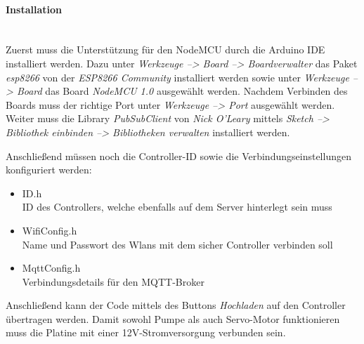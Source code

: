     \paragraph*{Installation}\mbox{}\\
    Zuerst muss die Unterstützung für den NodeMCU durch die Arduino IDE installiert werden. Dazu unter \textit{Werkzeuge --> Board --> Boardverwalter} das Paket \textit{esp8266} von der \textit{ESP8266 Community} installiert werden sowie unter \textit{Werkzeuge --> Board} das Board \textit{NodeMCU 1.0} ausgewählt werden. Nachdem Verbinden des Boards muss der richtige Port unter \textit{Werkzeuge --> Port} ausgewählt werden. Weiter muss die Library \textit{PubSubClient} von \textit{Nick O'Leary} mittels \textit{Sketch --> Bibliothek einbinden --> Bibliotheken verwalten} installiert werden.
    
    Anschließend müssen noch die Controller-ID sowie die Verbindungseinstellungen konfiguriert werden:
    \begin{itemize}
        \item ID.h\\
        ID des Controllers, welche ebenfalls auf dem Server hinterlegt sein muss
        \item WifiConfig.h\\
        Name und Passwort des Wlans mit dem sicher Controller verbinden soll
        \item MqttConfig.h\\
        Verbindungsdetails für den MQTT-Broker
    \end{itemize}

    Anschließend kann der Code mittels des Buttons \textit{Hochladen} auf den Controller übertragen werden. Damit sowohl Pumpe als auch Servo-Motor funktionieren muss die Platine mit einer 12V-Stromversorgung verbunden sein.
    
     
    